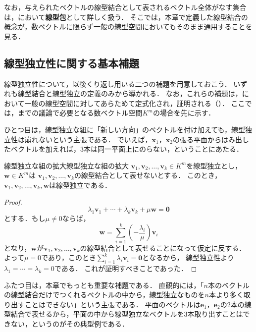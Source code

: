 なお，与えられたベクトルの線型結合として表されるベクトル全体がなす集合は，において\textbf{線型包}として詳しく扱う．
そこでは，本章で定義した線型結合の概念が，数ベクトルに限らず一般の線型空間においてもそのまま通用することを見る．

\subsection{線型独立性に関する基本補題}

線型独立性について，以後くり返し用いる二つの補題を用意しておこう．
いずれも線型結合と線型独立の定義のみから導かれる．
なお，これらの補題は，において一般の線型空間に対してあらためて定式化され，証明される（）．
ここでは，までの議論で必要となる数ベクトル空間$K^m$の場合を先に示す．

ひとつ目は，線型独立な組に「新しい方向」のベクトルを付け加えても，線型独立性は崩れないという主張である．
でいえば，$\bm{x}_1$，$\bm{x}_2$の張る平面からはみ出したベクトルを加えれば，$3$本は同一平面上にのらない，ということにあたる．

\begin{lemma}{線型独立な組の拡大}{線型独立な組の拡大}
  $\bm{v}_1, \bm{v}_2, \dots, \bm{v}_k \in K^m$を線型独立とし，$\bm{w} \in K^m$は
  $\bm{v}_1, \bm{v}_2, \dots, \bm{v}_k$の線型結合として表せないとする．
  このとき，$\bm{v}_1, \bm{v}_2, \dots, \bm{v}_k, \bm{w}$は線型独立である．
\end{lemma}

\begin{tleftbar}
\begin{proof}
  \[
    \lambda_1 \bm{v}_1 + \cdots + \lambda_k \bm{v}_k + \mu \bm{w} = \bm{0}
  \]
  とする．もし$\mu \ne 0$ならば，
  \[
    \bm{w} = \sum_{i=1}^{k} \left(-\frac{\lambda_i}{\mu}\right) \bm{v}_i
  \]
  となり，$\bm{w}$が$\bm{v}_1, \bm{v}_2, \dots, \bm{v}_k$の線型結合として表せることになって仮定に反する．
  よって$\mu = 0$であり，このとき$\sum_{i=1}^{k} \lambda_i \bm{v}_i = \bm{0}$となるから，
  線型独立性より$\lambda_1 = \cdots = \lambda_k = 0$である．
  これが証明すべきことであった．
\end{proof}
\end{tleftbar}

ふたつ目は，本章でもっとも重要な補題である．
直観的には，「$n$本のベクトルの線型結合だけでつくれるベクトルの中から，線型独立なものを$n$本より多く取り出すことはできない」という主張である．
平面のベクトルは$\bm{e}_1$，$\bm{e}_2$の$2$本の線型結合で表せるから，平面の中から線型独立なベクトルを$3$本取り出すことはできない，というのがその典型例である．

